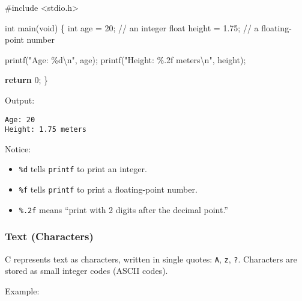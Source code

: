 \documentclass[
  letterpaper,
  DIV=11,
  numbers=noendperiod]{scrreprt}
\newenvironment{Shaded}{\begin{snugshade}}{\end{snugshade}}
\newcommand{\CommentTok}[1]{\textcolor[rgb]{0.37,0.37,0.37}{#1}}
\newcommand{\ControlFlowTok}[1]{\textcolor[rgb]{0.00,0.23,0.31}{\textbf{#1}}}
\newcommand{\DataTypeTok}[1]{\textcolor[rgb]{0.68,0.00,0.00}{#1}}
\newcommand{\DecValTok}[1]{\textcolor[rgb]{0.68,0.00,0.00}{#1}}
\newcommand{\FloatTok}[1]{\textcolor[rgb]{0.68,0.00,0.00}{#1}}
\newcommand{\ImportTok}[1]{\textcolor[rgb]{0.00,0.46,0.62}{#1}}
\newcommand{\NormalTok}[1]{\textcolor[rgb]{0.00,0.23,0.31}{#1}}
\newcommand{\OperatorTok}[1]{\textcolor[rgb]{0.37,0.37,0.37}{#1}}
\newcommand{\PreprocessorTok}[1]{\textcolor[rgb]{0.68,0.00,0.00}{#1}}
\newcommand{\SpecialCharTok}[1]{\textcolor[rgb]{0.37,0.37,0.37}{#1}}
\newcommand{\StringTok}[1]{\textcolor[rgb]{0.13,0.47,0.30}{#1}}
\providecommand{\tightlist}{%
  \setlength{\itemsep}{0pt}\setlength{\parskip}{0pt}}
\begin{document}
\begin{Shaded}
\begin{Highlighting}[]
\PreprocessorTok{\#include }\ImportTok{\textless{}stdio.h\textgreater{}}

\DataTypeTok{int}\NormalTok{ main}\OperatorTok{(}\DataTypeTok{void}\OperatorTok{)} \OperatorTok{\{}
    \DataTypeTok{int}\NormalTok{ age }\OperatorTok{=} \DecValTok{20}\OperatorTok{;}            \CommentTok{// an integer}
    \DataTypeTok{float}\NormalTok{ height }\OperatorTok{=} \FloatTok{1.75}\OperatorTok{;}     \CommentTok{// a floating{-}point number}

\NormalTok{    printf}\OperatorTok{(}\StringTok{"Age: }\SpecialCharTok{\%d\textbackslash{}n}\StringTok{"}\OperatorTok{,}\NormalTok{ age}\OperatorTok{);}
\NormalTok{    printf}\OperatorTok{(}\StringTok{"Height: }\SpecialCharTok{\%.2f}\StringTok{ meters}\SpecialCharTok{\textbackslash{}n}\StringTok{"}\OperatorTok{,}\NormalTok{ height}\OperatorTok{);}

    \ControlFlowTok{return} \DecValTok{0}\OperatorTok{;}
\OperatorTok{\}}
\end{Highlighting}
\end{Shaded}

Output:

\begin{verbatim}
Age: 20
Height: 1.75 meters
\end{verbatim}

Notice:

\begin{itemize}
\tightlist
\item
  \texttt{\%d} tells \texttt{printf} to print an integer.
\item
  \texttt{\%f} tells \texttt{printf} to print a floating-point number.
\item
  \texttt{\%.2f} means ``print with 2 digits after the decimal point.''
\end{itemize}

\subsubsection{Text (Characters)}\label{text-characters}

C represents text as characters, written in single quotes:
\texttt{\textquotesingle{}A\textquotesingle{}},
\texttt{\textquotesingle{}z\textquotesingle{}},
\texttt{\textquotesingle{}?\textquotesingle{}}. Characters are stored as
small integer codes (ASCII codes).

Example:
\end{document}
